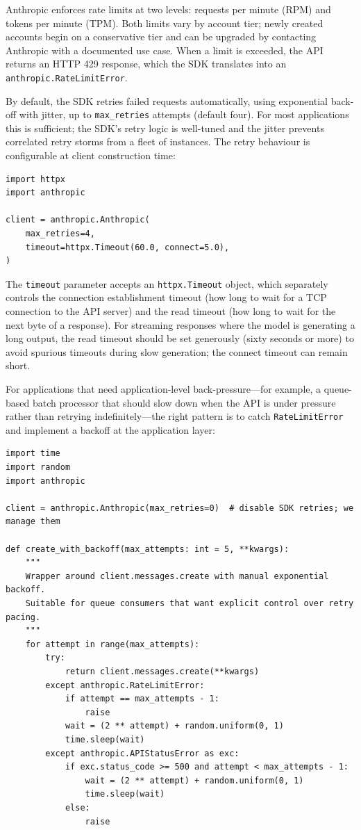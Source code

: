 Anthropic enforces rate limits at two levels: requests per minute (RPM) and tokens per
minute (TPM). Both limits vary by account tier; newly created accounts begin on a
conservative tier and can be upgraded by contacting Anthropic with a documented use
case. When a limit is exceeded, the API returns an HTTP 429 response, which the SDK
translates into an \texttt{anthropic.RateLimitError}.

By default, the SDK retries failed requests automatically, using exponential back-off
with jitter, up to \texttt{max\_retries} attempts (default four). For most applications
this is sufficient; the SDK's retry logic is well-tuned and the jitter prevents
correlated retry storms from a fleet of instances. The retry behaviour is configurable
at client construction time:

\begin{verbatim}
import httpx
import anthropic

client = anthropic.Anthropic(
    max_retries=4,
    timeout=httpx.Timeout(60.0, connect=5.0),
)
\end{verbatim}

The \texttt{timeout} parameter accepts an \texttt{httpx.Timeout} object, which
separately controls the connection establishment timeout (how long to wait for a TCP
connection to the API server) and the read timeout (how long to wait for the next byte
of a response). For streaming responses where the model is generating a long output,
the read timeout should be set generously (sixty seconds or more) to avoid spurious
timeouts during slow generation; the connect timeout can remain short.

For applications that need application-level back-pressure---for example, a queue-based
batch processor that should slow down when the API is under pressure rather than
retrying indefinitely---the right pattern is to catch \texttt{RateLimitError} and
implement a backoff at the application layer:

\begin{verbatim}
import time
import random
import anthropic

client = anthropic.Anthropic(max_retries=0)  # disable SDK retries; we manage them

def create_with_backoff(max_attempts: int = 5, **kwargs):
    """
    Wrapper around client.messages.create with manual exponential backoff.
    Suitable for queue consumers that want explicit control over retry pacing.
    """
    for attempt in range(max_attempts):
        try:
            return client.messages.create(**kwargs)
        except anthropic.RateLimitError:
            if attempt == max_attempts - 1:
                raise
            wait = (2 ** attempt) + random.uniform(0, 1)
            time.sleep(wait)
        except anthropic.APIStatusError as exc:
            if exc.status_code >= 500 and attempt < max_attempts - 1:
                wait = (2 ** attempt) + random.uniform(0, 1)
                time.sleep(wait)
            else:
                raise
\end{verbatim}

